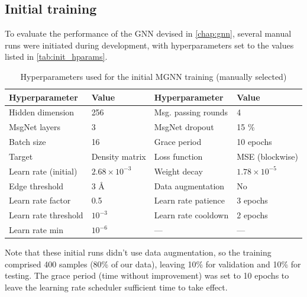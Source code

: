 \subsection{Initial training}
\label{subsec:qm9_isomers_initial}
To evaluate the performance of the GNN devised in \autoref{chap:gnn}, several manual runs were initiated during development, with hyperparameters set to the values listed in \autoref{tab:init_hparams}. 
\begin{table}[H]
    \centering
    \caption[Hyperparameters - initial MGNN training (manually selected)]{Hyperparameters used for the initial MGNN training (manually selected)}
    \label{tab:init_hparams}
    \begin{tabular}{ll ll}
        \toprule
        \textbf{Hyperparameter} & \textbf{Value} & \textbf{Hyperparameter} & \textbf{Value} \\
        \midrule
        Hidden dimension & 256 & Msg. passing rounds & 4 \\
        MsgNet layers & 3 & MsgNet dropout & 15 \% \\
        Batch size & 16 & Grace period & 10 epochs \\
        Target & Density matrix & Loss function & MSE (blockwise) \\
        Learn rate (initial) & $2.68 \times 10^{-3}$ & Weight decay & $1.78 \times 10^{-5}$ \\
        Edge threshold & 3 \AA & Data augmentation & No \\
        \midrule
        Learn rate factor & 0.5 & Learn rate patience & 3 epochs \\
        Learn rate threshold & $10^{-3}$ & Learn rate cooldown & 2 epochs \\
        Learn rate min & $10^{-6}$ & — & — \\
        \bottomrule
    \end{tabular}
\end{table}
Note that these initial runs didn't use data augmentation, so the training comprised 400 samples (80\% of our data), leaving 10\% for validation and 10\% for testing. The grace period (time without improvement) was set to 10 epochs to leave the learning rate scheduler sufficient time to take effect.\\

